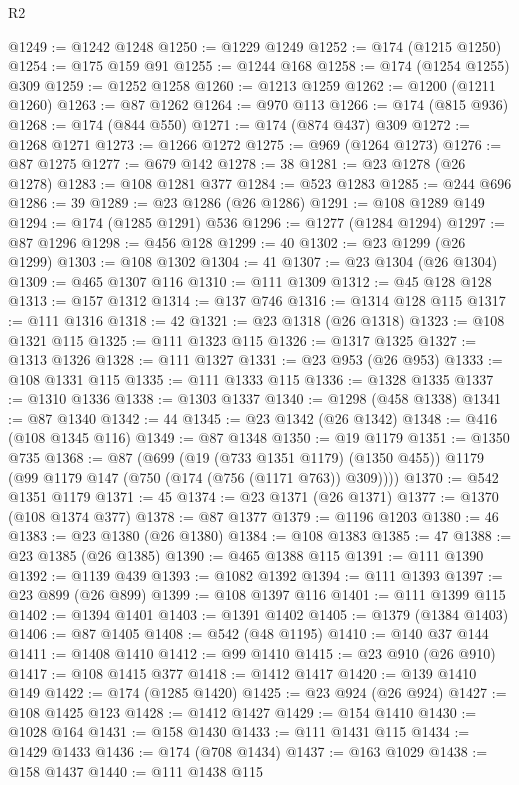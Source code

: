 \begin{lexlean}{R2}
\begin{coremodule}
{{{{{{{{{{{{{{{{{{{{{{{{{{{{{{{{{{{{{{{{{{{{{{{{{{{{{{{{{{{{{{{{{{{{{{{{{{{{{{{{{{{{{{{{{{{{{{{{{{{{{{{{{{{{{{{{{{{{{{{{{{{{{{{{{{{{{{{{{{{{@1249 := @1242 @1248
@1250 := @1229 @1249
@1252 := @174 (@1215 @1250)
@1254 := @175 @159 @91
@1255 := @1244 @168
@1258 := @174 (@1254 @1255) @309
@1259 := @1252 @1258
@1260 := @1213 @1259
@1262 := @1200 (@1211 @1260)
@1263 := @87 @1262
@1264 := @970 @113
@1266 := @174 (@815 @936)
@1268 := @174 (@844 @550)
@1271 := @174 (@874 @437) @309
@1272 := @1268 @1271
@1273 := @1266 @1272
@1275 := @969 (@1264 @1273)
@1276 := @87 @1275
@1277 := @679 @142
@1278 := 38
@1281 := @23 @1278 (@26 @1278)
@1283 := @108 @1281 @377
@1284 := @523 @1283
@1285 := @244 @696
@1286 := 39
@1289 := @23 @1286 (@26 @1286)
@1291 := @108 @1289 @149
@1294 := @174 (@1285 @1291) @536
@1296 := @1277 (@1284 @1294)
@1297 := @87 @1296
@1298 := @456 @128
@1299 := 40
@1302 := @23 @1299 (@26 @1299)
@1303 := @108 @1302
@1304 := 41
@1307 := @23 @1304 (@26 @1304)
@1309 := @465 @1307 @116
@1310 := @111 @1309
@1312 := @45 @128 @128
@1313 := @157 @1312
@1314 := @137 @746
@1316 := @1314 @128 @115
@1317 := @111 @1316
@1318 := 42
@1321 := @23 @1318 (@26 @1318)
@1323 := @108 @1321 @115
@1325 := @111 @1323 @115
@1326 := @1317 @1325
@1327 := @1313 @1326
@1328 := @111 @1327
@1331 := @23 @953 (@26 @953)
@1333 := @108 @1331 @115
@1335 := @111 @1333 @115
@1336 := @1328 @1335
@1337 := @1310 @1336
@1338 := @1303 @1337
@1340 := @1298 (@458 @1338)
@1341 := @87 @1340
@1342 := 44
@1345 := @23 @1342 (@26 @1342)
@1348 := @416 (@108 @1345 @116)
@1349 := @87 @1348
@1350 := @19 @1179
@1351 := @1350 @735
@1368 := @87
    (@699
      (@19 (@733 @1351 @1179) (@1350 @455))
      @1179
      (@99 @1179 @147 (@750 (@174 (@756 (@1171 @763)) @309))))
@1370 := @542 @1351 @1179
@1371 := 45
@1374 := @23 @1371 (@26 @1371)
@1377 := @1370 (@108 @1374 @377)
@1378 := @87 @1377
@1379 := @1196 @1203
@1380 := 46
@1383 := @23 @1380 (@26 @1380)
@1384 := @108 @1383
@1385 := 47
@1388 := @23 @1385 (@26 @1385)
@1390 := @465 @1388 @115
@1391 := @111 @1390
@1392 := @1139 @439
@1393 := @1082 @1392
@1394 := @111 @1393
@1397 := @23 @899 (@26 @899)
@1399 := @108 @1397 @116
@1401 := @111 @1399 @115
@1402 := @1394 @1401
@1403 := @1391 @1402
@1405 := @1379 (@1384 @1403)
@1406 := @87 @1405
@1408 := @542 (@48 @1195)
@1410 := @140 @37 @144
@1411 := @1408 @1410
@1412 := @99 @1410
@1415 := @23 @910 (@26 @910)
@1417 := @108 @1415 @377
@1418 := @1412 @1417
@1420 := @139 @1410 @149
@1422 := @174 (@1285 @1420)
@1425 := @23 @924 (@26 @924)
@1427 := @108 @1425 @123
@1428 := @1412 @1427
@1429 := @154 @1410
@1430 := @1028 @164
@1431 := @158 @1430
@1433 := @111 @1431 @115
@1434 := @1429 @1433
@1436 := @174 (@708 @1434)
@1437 := @163 @1029
@1438 := @158 @1437
@1440 := @111 @1438 @115
}}}}}}}}}}}}}}}}}}}}}}}}}}}}}}}}}}}}}}}}}}}}}}}}}}}}}}}}}}}}}}}}}}}}}}}}}}}}}}}}}}}}}}}}}}}}}}}}}}}}}}}}}}}}}}}}}}}}}}}}}}}}}}}}}}}}}}}}}}}}
\end{coremodule}
\end{lexlean}

